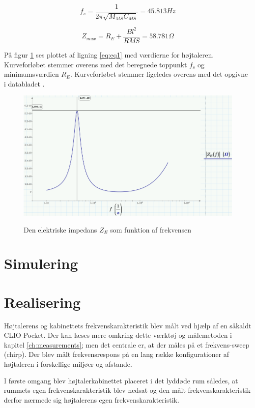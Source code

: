 \begin{equation}\label{eq:fs}
f_s=\frac{1}{2 \pi \sqrt{M_{MS} C_{MS}}}=45.813Hz
\end{equation}

\begin{equation}\label{eq:Zmax}
Z_{max}=R_E+\frac{Bl^2}{R{MS}}=58.781\Omega
\end{equation}

På figur \ref{fig:ZE_graf}  ses plottet af ligning \ref{eq:eq1} med værdierne for højtaleren. Kurveforløbet stemmer overens med det beregnede toppunkt $f_s$ og minimumsværdien $R_E$. Kurveforløbet stemmer ligeledes overens med det opgivne i databladet \citep{FW168}.

\begin{figure}[H]
	\centering
	\includegraphics[width=\textwidth]{Pics/ZE_graf.PNG}
	\label{fig:ZE_graf}
	\caption{Den elektriske impedans $Z_E$ som funktion af frekvensen} 
\end{figure}

\section{Simulering}

\newpage
\section{Realisering}
Højtalerens og kabinettets frekvenskarakteristik blev målt ved hjælp af en såkaldt CLIO Pocket. Der kan læses mere omkring dette værktøj og målemetoden i kapitel \ref{ch:measurements}; men det centrale er, at der måles på et frekvens-sweep (chirp). Der blev målt frekvensrespons på en lang række konfigurationer af højtaleren i forskellige miljøer og afstande.

I første omgang blev højtalerkabinettet placeret i det lyddøde rum således, at rummets egen frekvenskarakteristik blev nedsat og den målt frekvenskarakteristik derfor nærmede sig højtalerens egen frekvenskarakteristik.


